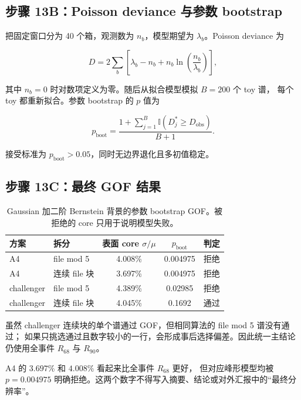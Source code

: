\documentclass[UTF8,12pt,a4paper,oneside,fontset=none]{ctexart}
\numberwithin{equation}{section}
\newcommand{\Rsixtyeight}{R_{68}}
\newcommand{\Rninety}{R_{90}}
\begin{document}
\subsection{步骤 13B：Poisson deviance 与参数 bootstrap}

把固定窗口分为 40 个箱，观测数为 \(n_b\)，模型期望为 \(\lambda_b\)。Poisson deviance 为

\begin{equation}
D
=
2\sum_b
\left[
\lambda_b-n_b+n_b\ln\left(\frac{n_b}{\lambda_b}\right)
\right],
\label{eq:poisson-deviance}
\end{equation}

其中 \(n_b=0\) 时对数项定义为零。随后从拟合模型模拟 \(B=200\) 个 toy 谱，
每个 toy 都重新拟合。参数 bootstrap 的 \(p\) 值为

\begin{equation}
p_{\mathrm{boot}}
=
\frac{1+\sum_{j=1}^{B}\mathbb I(D_j^{\ast}\ge D_{\mathrm{obs}})}{B+1}.
\label{eq:gof-pvalue}
\end{equation}

接受标准为 \(p_{\mathrm{boot}}>0.05\)，同时无边界退化且多初值稳定。

\subsection{步骤 13C：最终 GOF 结果}

\begin{table}[H]
\centering
\caption{Gaussian 加二阶 Bernstein 背景的参数 bootstrap GOF。被拒绝的 core 只用于说明模型失败。}
\label{tab:gof-results}
\begin{tabular}{llccc}
\toprule
方案 & 拆分 & 表面 core \(\sigma/\mu\) & \(p_{\mathrm{boot}}\) & 判定 \\
\midrule
A4 & file mod 5 & 4.008\% & 0.004975 & 拒绝 \\
A4 & 连续 file 块 & 3.697\% & 0.004975 & 拒绝 \\
challenger & file mod 5 & 4.389\% & 0.02985 & 拒绝 \\
challenger & 连续 file 块 & 4.045\% & 0.1692 & 通过 \\
\bottomrule
\end{tabular}
\end{table}

虽然 challenger 连续块的单个谱通过 GOF，但相同算法的 file mod 5 谱没有通过；
如果只挑选通过且数字较小的一行，会形成事后选择偏差。因此统一主结论仍使用全事件 \(\Rsixtyeight\) 与 \(\Rninety\)。

\begin{warningbox}
A4 的 \(3.697\%\) 和 \(4.008\%\) 看起来比全事件 \(\Rsixtyeight\) 更好，
但对应峰形模型均被 \(p=0.004975\) 明确拒绝。这两个数字不得写入摘要、结论或对外汇报中的“最终分辨率”。
\end{warningbox}
\end{document}
